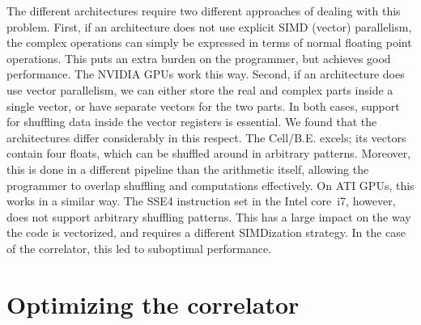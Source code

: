 \documentclass{article}
\begin{document}
The different architectures require two different approaches of
dealing with this problem. First, if an architecture does not use
explicit SIMD (vector) parallelism, the complex operations can simply
be expressed in terms of normal floating point operations. This puts
an extra burden on the programmer, but achieves good performance. The
NVIDIA GPUs work this way.  Second, if an architecture does use vector
parallelism, we can either store the real and complex parts inside a
single vector, or have separate vectors for the two parts.  In both
cases, support for shuffling data inside the vector registers is
essential. We found that the architectures differ considerably in this
respect.  The Cell/B.E. excels; its vectors contain four floats, which
can be shuffled around in arbitrary patterns. Moreover, this is done
in a different pipeline than the arithmetic itself, allowing the
programmer to overlap shuffling and computations effectively.  On ATI
GPUs, this works in a similar way.  The SSE4 instruction set in the
Intel core~i7, however, does not support arbitrary shuffling patterns.
This has a large impact on the way the code is vectorized, and
requires a different SIMDization strategy. In the case of the
correlator, this led to suboptimal performance.






\section{Optimizing the correlator}
\end{document}
